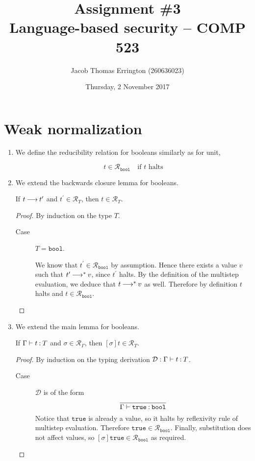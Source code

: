 \documentclass[11pt,letterpaper]{article}
\author{Jacob Thomas Errington (260636023)}
\title{Assignment \#3\\Language-based security -- COMP 523}
\date{Thursday, 2 November 2017}
\renewcommand{\R}{\mathcal{R}}
\newcommand{\bool}{\mathtt{bool}}
\newcommand{\True}{\mathtt{true}}
\begin{document}
\maketitle

\section{Weak normalization}

\begin{enumerate}
  \item
    We define the reducibility relation for booleans similarly as for unit,

    \begin{equation*}
      t \in \R_{\bool} \quad\text{if $t$ halts}
    \end{equation*}

  \item
    We extend the backwards closure lemma for booleans.

    \begin{lem}
      If $t \mathbin{\longrightarrow} t^\prime$ and $t^\prime \in \R_T$, then $t \in \R_T$.
    \end{lem}

    \begin{proof}
      By induction on the type $T$.
      \begin{description}
        \item[Case] $T = \bool$.

          We know that $t^\prime \in \R_\bool$ by assumption.
          Hence there exists a value $v$ such that $t^\prime \mathbin{\longrightarrow}^* v$,
          since $t^\prime$ halts.
          By the definition of the multistep evaluation,
          we deduce that $t \mathbin{\longrightarrow}^* v$ as well.
          Therefore by definition $t$ halts and $t \in \R_\bool$.
      \end{description}
    \end{proof}

  \item
    We extend the main lemma for booleans.

    \begin{lem}
      If $\Gamma \vdash t \mathbin{:} T$
      and $\sigma \in \R_\Gamma$,
      then $[\sigma]t \in \R_T$.
    \end{lem}

    \begin{proof}
      By induction on the typing derivation
      $\mathcal{D} : \Gamma \vdash t \mathbin{:} T$.
      \begin{description}
        \item[Case] $\mathcal{D}$ is of the form
          \begin{equation*}
            \infer{\Gamma \proves \True \hastype \bool}{}
          \end{equation*}
          Notice that $\True$ is already a value, so it halts by reflexivity
          rule of multistep evaluation. Therefore $\True \in \R_\bool$.
          Finally, substitution does not affect values,
          so $[\sigma]\True \in \R_\bool$ as required.


\end{description}
\end{proof}
\end{enumerate}
\end{document}
